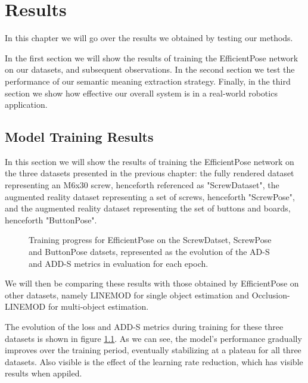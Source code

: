 \chapter{Results}

In this chapter we will go over the results we obtained by testing our methods.

In the first section we will show the results of training the EfficientPose network on our datasets, and subsequent observations. In the second section we test the performance of our semantic meaning extraction strategy. Finally, in the third section we show how effective our overall system is in a real-world robotics application.

\section{Model Training Results}

In this section we will show the results of training the EfficientPose network on the three datasets presented in the previous chapter: the fully rendered dataset representing an M6x30 screw, henceforth referenced as "ScrewDataset", the augmented reality dataset representing a set of screws, henceforth "ScrewPose", and the augmented reality dataset representing the set of buttons and boards, henceforth "ButtonPose".

\begin{figure}[htp]



    \caption{Training progress for EfficientPose on the ScrewDatset, ScrewPose and ButtonPose datsets, represented as the evolution of the AD-S and ADD-S metrics in evaluation for each epoch.}
    \label{fig:training_progress}
\end{figure}

We will then be comparing these results with those obtained by EfficientPose on other datasets, namely LINEMOD for single object estimation and Occlusion-LINEMOD for multi-object estimation.

The evolution of the loss and ADD-S metrics during training for these three datasets is shown in figure \ref{fig:training_progress}. As we can see, the model's performance gradually improves over the training period, eventually stabilizing at a plateau for all three datasets. Also visible is the effect of the learning rate reduction, which has visible results when appiled.

